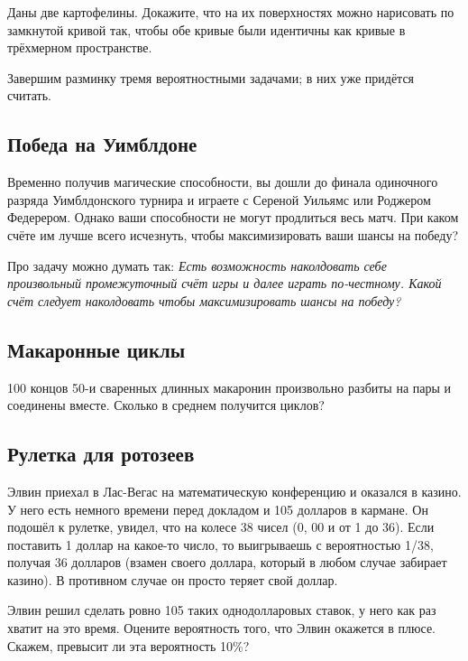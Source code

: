 Даны две картофелины.
Докажите, что на их поверхностях можно нарисовать по замкнутой кривой так, чтобы обе кривые были идентичны как кривые в трёхмерном пространстве.

\medskip

Завершим разминку тремя вероятностными задачами; в них уже придётся считать.

\subsection*{Победа на Уимблдоне}

Временно получив магические способности, вы дошли до финала одиночного разряда Уимблдонского турнира и играете с Сереной Уильямс или Роджером Федерером.
Однако ваши способности не могут продлиться весь матч.
При каком счёте им лучше всего исчезнуть, чтобы максимизировать ваши шансы на победу?

\begin{addedbytheeditors}
Про задачу можно думать так: 
\textit{Есть возможность наколдовать себе произвольный промежуточный счёт игры и далее играть по-честному.
Какой счёт следует наколдовать чтобы максимизировать шансы на победу?}\pr
\end{addedbytheeditors}



\subsection*{Макаронные циклы}

100 концов 50-и сваренных длинных макаронин произвольно разбиты на пары и соединены вместе.
Сколько в среднем получится циклов?

\subsection*{Рулетка для ротозеев}\label{Рулетка для ротозеев}

Элвин приехал в Лас-Вегас на математическую конференцию и оказался в казино.
У него есть немного времени перед докладом и 105 долларов в кармане.
Он подошёл к рулетке, увидел, что на колесе 38 чисел (0, 00 и от 1 до 36).
Если поставить 1 доллар на какое-то число, то выигрываешь с вероятностью 1/38, получая 36 долларов (взамен своего доллара, который в любом случае забирает казино).
В противном случае он просто теряет свой доллар.

Элвин решил сделать ровно 105 таких однодолларовых ставок, 
у него как раз хватит на это время.
Оцените вероятность того, что Элвин окажется в плюсе.
Скажем, превысит ли эта вероятность 10\%?
